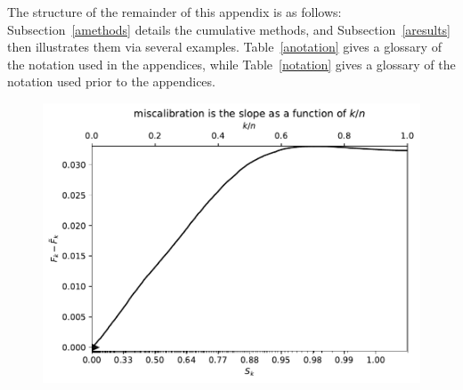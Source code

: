 \documentclass{article}
\begin{document}
The structure of the remainder of this appendix is as follows:
Subsection~\ref{amethods} details the cumulative methods,
and Subsection~\ref{aresults} then illustrates them via several examples.
Table~\ref{anotation} gives a glossary of the notation used
in the appendices, while Table~\ref{notation} gives a glossary
of the notation used prior to the appendices.


\begin{figure}
\begin{centering}

\parbox{\imsize}{\includegraphics[width=\imsize]
                {./codes/unweighted/full}}

\vspace{\vertsep}


\end{centering}
\end{figure}
\end{document}
